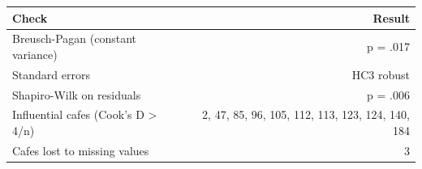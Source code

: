 \begin{tabular}{lr}
\toprule
Check & Result \\
\midrule
Breusch-Pagan (constant variance) & p = .017 \\
Standard errors & HC3 robust \\
Shapiro-Wilk on residuals & p = .006 \\
Influential cafes (Cook's D > 4/n) & 2, 47, 85, 96, 105, 112, 113, 123, 124, 140, 184 \\
Cafes lost to missing values & 3 \\
\bottomrule
\end{tabular}
